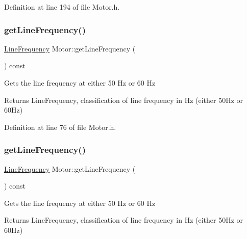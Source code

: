 Definition at line 194 of file Motor.\+h.

\mbox{\label{class_motor_a41e71462fe60674a5554e47d0079b0f3}} 
\subsubsection{\texorpdfstring{get\+Line\+Frequency()}{getLineFrequency()}\hspace{0.1cm}{\footnotesize\ttfamily [1/3]}}
{\footnotesize\ttfamily \hyperlink{class_motor_acee1bdf1b684ad36cb80dc2829d9fcee}{Line\+Frequency} Motor\+::get\+Line\+Frequency (\begin{DoxyParamCaption}{ }\end{DoxyParamCaption}) const\hspace{0.3cm}{\ttfamily [inline]}}

Gets the line frequency at either 50 Hz or 60 Hz

\begin{DoxyReturn}{Returns}
Line\+Frequency, classification of line frequency in Hz (either 50\+Hz or 60\+Hz) 
\end{DoxyReturn}


Definition at line 76 of file Motor.\+h.

\mbox{\label{class_motor_a41e71462fe60674a5554e47d0079b0f3}} 
\subsubsection{\texorpdfstring{get\+Line\+Frequency()}{getLineFrequency()}\hspace{0.1cm}{\footnotesize\ttfamily [2/3]}}
{\footnotesize\ttfamily \hyperlink{class_motor_acee1bdf1b684ad36cb80dc2829d9fcee}{Line\+Frequency} Motor\+::get\+Line\+Frequency (\begin{DoxyParamCaption}{ }\end{DoxyParamCaption}) const\hspace{0.3cm}{\ttfamily [inline]}}

Gets the line frequency at either 50 Hz or 60 Hz

\begin{DoxyReturn}{Returns}
Line\+Frequency, classification of line frequency in Hz (either 50\+Hz or 60\+Hz) 
\end{DoxyReturn}


